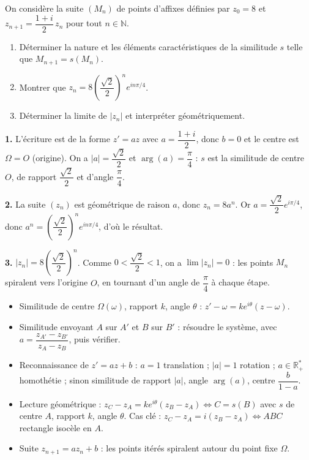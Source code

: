 \documentclass[11pt]{article}
\begin{document}
\begin{exercice}
On considère la suite $(M_n)$ de points d'affixes définies par $z_0 = 8$ et $z_{n+1} = \dfrac{1+i}{2}\,z_n$ pour tout $n \in \mathbb{N}$.
\begin{enumerate}
\item Déterminer la nature et les éléments caractéristiques de la similitude $s$ telle que $M_{n+1} = s(M_n)$.
\item Montrer que $z_n = 8\left(\dfrac{\sqrt{2}}{2}\right)^n e^{in\pi/4}$.
\item Déterminer la limite de $|z_n|$ et interpréter géométriquement.
\end{enumerate}
\end{exercice}

\begin{corrige}[Exercice 1]
\textbf{1.} L'écriture est de la forme $z' = az$ avec $a = \dfrac{1+i}{2}$, donc $b = 0$ et le centre est $\Omega = O$ (origine). On a $|a| = \dfrac{\sqrt{2}}{2}$ et $\arg(a) = \dfrac{\pi}{4}$ : $s$ est la similitude de centre $O$, de rapport $\dfrac{\sqrt{2}}{2}$ et d'angle $\dfrac{\pi}{4}$.

\textbf{2.} La suite $(z_n)$ est géométrique de raison $a$, donc $z_n = 8a^n$. Or $a = \dfrac{\sqrt{2}}{2}e^{i\pi/4}$, donc $a^n = \left(\dfrac{\sqrt{2}}{2}\right)^n e^{in\pi/4}$, d'où le résultat.

\textbf{3.} $|z_n| = 8\left(\dfrac{\sqrt{2}}{2}\right)^n$. Comme $0 < \dfrac{\sqrt{2}}{2} < 1$, on a $\lim |z_n| = 0$ : les points $M_n$ spiralent vers l'origine $O$, en tournant d'un angle de $\dfrac{\pi}{4}$ à chaque étape.
\end{corrige}

\begin{aretenir}
\begin{itemize}
\item Similitude de centre $\Omega(\omega)$, rapport $k$, angle $\theta$ : $z' - \omega = ke^{i\theta}(z - \omega)$.
\item Similitude envoyant $A$ sur $A'$ et $B$ sur $B'$ : résoudre le système, avec $a = \dfrac{z_{A'} - z_{B'}}{z_A - z_B}$, puis vérifier.
\item Reconnaissance de $z' = az + b$ : $a = 1$ translation ; $|a| = 1$ rotation ; $a \in \mathbb{R}_+^*$ homothétie ; sinon similitude de rapport $|a|$, angle $\arg(a)$, centre $\dfrac{b}{1-a}$.
\item Lecture géométrique : $z_C - z_A = ke^{i\theta}(z_B - z_A) \iff C = s(B)$ avec $s$ de centre $A$, rapport $k$, angle $\theta$. Cas clé : $z_C - z_A = i(z_B - z_A) \iff ABC$ rectangle isocèle en $A$.
\item Suite $z_{n+1} = az_n + b$ : les points itérés spiralent autour du point fixe $\Omega$.
\end{itemize}
\end{aretenir}
\end{document}
